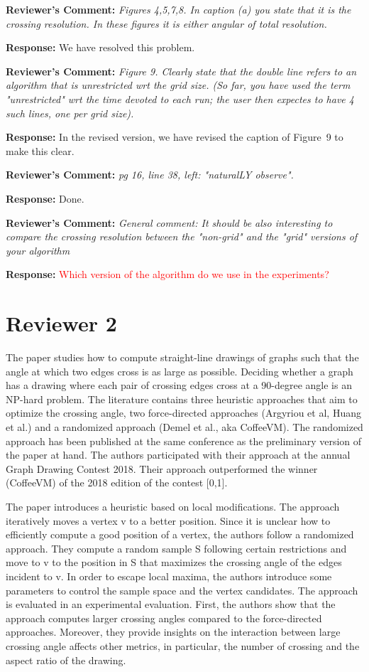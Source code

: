 \documentclass{article}
\newcommand{\rcomment}[1]{\vspace{0.3cm} \item \textbf{Reviewer's Comment:} {\em #1}}
\newcommand{\tcomment}[1]{\vspace{0.3cm} {\color{red} \item \textbf{Reviewer's Comment:} {\em #1}}}
\newcommand{\response}{\vspace{0.2cm} \textbf{Response: }}
\begin{document}
\begin{itemize}
\rcomment{Figures 4,5,7,8. In caption (a) you state that it is the crossing resolution. In these figures it is either angular of total resolution.}

\response{We have resolved this problem.}

\rcomment{Figure 9. Clearly state that the double line refers to an algorithm that is unrestricted wrt the grid size. (So far, you have used the term "unrestricted" wrt the time devoted to each run; the user then expectes to have 4 such lines, one per grid size).}

\response{In the revised version, we have revised the caption of Figure~9 to make this clear.}

\rcomment{pg 16, line 38, left: "naturalLY observe".}

\response{Done.}

\tcomment{General comment: It should be also interesting to compare the crossing resolution between the "non-grid" and the "grid" versions of your algorithm}

\response{\textcolor{red}{Which version of the algorithm do we use in the experiments?}}
\end{itemize}


\newpage
\section*{Reviewer 2}

The paper studies how to compute straight-line drawings of graphs such that the angle at which two edges cross is as large as possible. Deciding whether a graph has a drawing where each pair of crossing edges cross at a 90-degree angle is an NP-hard problem. The literature contains three heuristic approaches that aim to optimize the crossing angle, two force-directed approaches (Argyriou et al, Huang et al.) and a randomized approach (Demel et al., aka CoffeeVM). The randomized approach has been published at the same conference as the preliminary version of the paper at hand.  The authors participated with their approach at the annual Graph Drawing Contest 2018. Their approach outperformed the winner (CoffeeVM) of the 2018 edition of the contest [0,1].


The paper introduces a heuristic based on local modifications. The approach iteratively moves a vertex v to a better position. Since it is unclear how to efficiently compute a good position of a vertex, the authors follow a randomized approach. They compute a random sample S following certain restrictions and move to v to the position in S that maximizes the crossing angle of the edges incident to v. In order to escape local maxima, the authors introduce some parameters to control the sample space and the vertex candidates. The approach is evaluated in an experimental evaluation. First, the authors show that the approach computes larger crossing angles compared to the force-directed approaches. Moreover, they provide insights on the interaction between large crossing angle affects other metrics, in particular, the number of crossing and the aspect ratio of the drawing.
\end{document}
